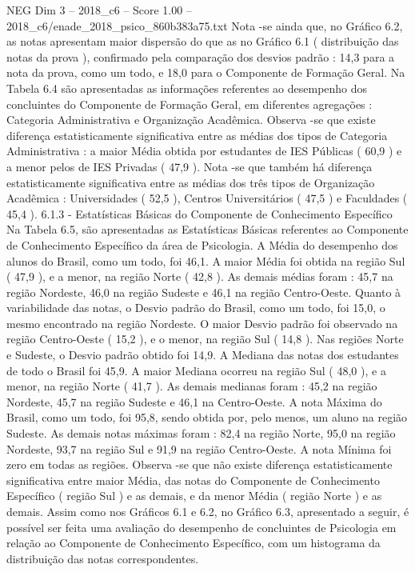 \begin{textsample}{NEG Dim 3 – 2018\_c6 – Score 1.00 – 2018\_c6/enade\_2018\_psico\_860b383a75.txt}
Nota -se ainda que, no Gráfico 6.2, as notas apresentam maior dispersão do que as no Gráfico 6.1 ( distribuição das notas da prova ), confirmado pela comparação dos desvios padrão : 14,3 para a nota da prova, como um todo, e 18,0 para o Componente de Formação Geral.
Na Tabela 6.4 são apresentadas as informações referentes ao desempenho dos concluintes do Componente de Formação Geral, em diferentes agregações : Categoria Administrativa e Organização Acadêmica.
Observa -se que existe diferença estatisticamente significativa entre as médias dos tipos de Categoria Administrativa : a maior Média obtida por estudantes de IES Públicas ( 60,9 ) e a menor pelos de IES Privadas ( 47,9 ).
Nota -se que também há diferença estatisticamente significativa entre as médias dos três tipos de Organização Acadêmica : Universidades ( 52,5 ), Centros Universitários ( 47,5 ) e Faculdades ( 45,4 ). 6.1.3 - Estatísticas Básicas do Componente de Conhecimento Específico Na Tabela 6.5, são apresentadas as Estatísticas Básicas referentes ao Componente de Conhecimento Específico da área de Psicologia.
A Média do desempenho dos alunos do Brasil, como um todo, foi 46,1.
A maior Média foi obtida na região Sul ( 47,9 ), e a menor, na região Norte ( 42,8 ).
As demais médias foram : 45,7 na região Nordeste, 46,0 na região Sudeste e 46,1 na região Centro-Oeste.
Quanto à variabilidade das notas, o Desvio padrão do Brasil, como um todo, foi 15,0, o mesmo encontrado na região Nordeste.
O maior Desvio padrão foi observado na região Centro-Oeste ( 15,2 ), e o menor, na região Sul ( 14,8 ).
Nas regiões Norte e Sudeste, o Desvio padrão obtido foi 14,9.
A Mediana das notas dos estudantes de todo o Brasil foi 45,9.
A maior Mediana ocorreu na região Sul ( 48,0 ), e a menor, na região Norte ( 41,7 ).
As demais medianas foram : 45,2 na região Nordeste, 45,7 na região Sudeste e 46,1 na Centro-Oeste.
A nota Máxima do Brasil, como um todo, foi 95,8, sendo obtida por, pelo menos, um aluno na região Sudeste.
As demais notas máximas foram : 82,4 na região Norte, 95,0 na região Nordeste, 93,7 na região Sul e 91,9 na região Centro-Oeste.
A nota Mínima foi zero em todas as regiões.
Observa -se que não existe diferença estatisticamente significativa entre maior Média, das notas do Componente de Conhecimento Específico ( região Sul ) e as demais, e da menor Média ( região Norte ) e as demais.
Assim como nos Gráficos 6.1 e 6.2, no Gráfico 6.3, apresentado a seguir, é possível ser feita uma avaliação do desempenho de concluintes de Psicologia em relação ao Componente de Conhecimento Específico, com um histograma da distribuição das notas correspondentes.

\end{textsample}
